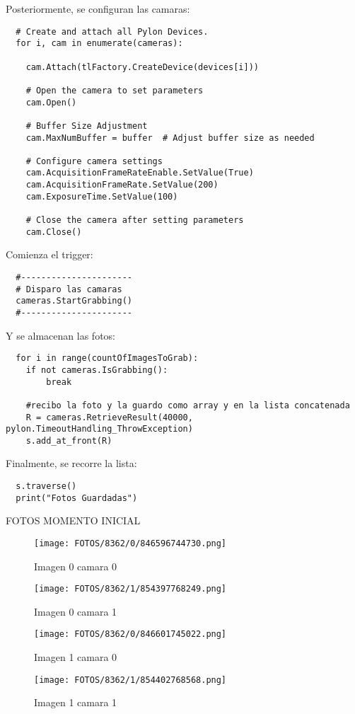 \documentclass{article}
\begin{document}
Posteriormente, se configuran las camaras:

\begin{lstlisting}
  # Create and attach all Pylon Devices.
  for i, cam in enumerate(cameras):
      
    cam.Attach(tlFactory.CreateDevice(devices[i]))

    # Open the camera to set parameters
    cam.Open()

    # Buffer Size Adjustment
    cam.MaxNumBuffer = buffer  # Adjust buffer size as needed
    
    # Configure camera settings
    cam.AcquisitionFrameRateEnable.SetValue(True)
    cam.AcquisitionFrameRate.SetValue(200)
    cam.ExposureTime.SetValue(100) 

    # Close the camera after setting parameters
    cam.Close()
\end{lstlisting}

Comienza el trigger:

\begin{lstlisting}
  #----------------------
  # Disparo las camaras
  cameras.StartGrabbing()
  #----------------------
\end{lstlisting}

Y se almacenan las fotos:

\begin{lstlisting}
  for i in range(countOfImagesToGrab):
    if not cameras.IsGrabbing():
        break

    #recibo la foto y la guardo como array y en la lista concatenada
    R = cameras.RetrieveResult(40000, pylon.TimeoutHandling_ThrowException)
    s.add_at_front(R)
\end{lstlisting}

Finalmente, se recorre la lista:

\begin{lstlisting}
  s.traverse()
  print("Fotos Guardadas")
\end{lstlisting}


FOTOS MOMENTO INICIAL

\begin{figure}[H]
  \centering
  \begin{minipage}[b]{0.45\textwidth}
    \centering
    \texttt{[image: FOTOS/8362/0/846596744730.png]}
    \caption{Imagen 0 camara 0}
  \end{minipage}
  \begin{minipage}[b]{0.45\textwidth}
    \centering
    \texttt{[image: FOTOS/8362/1/854397768249.png]}
    \caption{Imagen 0 camara 1}
  \end{minipage}
  \begin{minipage}[b]{0.45\textwidth}
    \centering
    \texttt{[image: FOTOS/8362/0/846601745022.png]}
    \caption{Imagen 1 camara 0}
  \end{minipage}
  \begin{minipage}[b]{0.45\textwidth}
    \centering
    \texttt{[image: FOTOS/8362/1/854402768568.png]}
    \caption{Imagen 1 camara 1}
  \end{minipage}
\end{figure}
\end{document}
